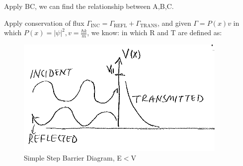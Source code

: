 \documentclass{school-22.101-notes}
\begin{document}
\begin{itemize}
Apply BC, we can find the relationship between A,B,C. 

Apply conservation of flux $\Gamma_{\mbox{INC}} = \Gamma_{\mbox{REFL}} + \Gamma_{\mbox{TRANS}}$, and given $\Gamma = P(x) v$ in which $P(x) = |\psi|^2, v = \frac{\hbar k}{m}$, we know: 
in which R and T are defined as:
\end{itemize}



\begin{figure}[h!]
    \centering
    \includegraphics[width=4in]{images/qm/step-barrier-caseB.png}
    \caption{Simple Step Barrier Diagram, E$<$V}
\end{figure}
\end{document}
